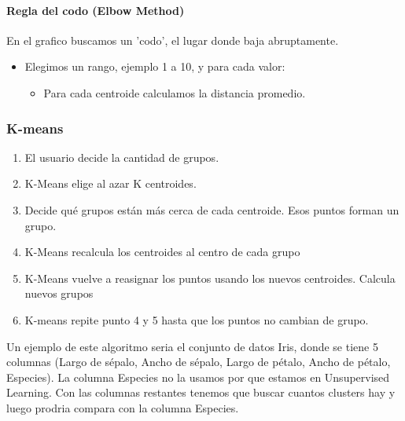 \documentclass[../main.tex]{subfiles}
\begin{document}
        \paragraph{Regla del codo (Elbow Method)}
            En el grafico buscamos un 'codo', el lugar donde baja abruptamente.
            \begin{itemize}
                \item Elegimos un rango, ejemplo 1 a 10, y para cada valor:
                    \begin{itemize}
                        \item Para cada centroide calculamos la distancia promedio.
                    \end{itemize}
            \end{itemize}
    \subsubsection{K-means}
        \begin{enumerate}
            \item El usuario decide la cantidad de grupos.
            \item K-Means elige al azar K centroides.
            \item Decide qué grupos están más cerca de cada centroide. Esos puntos forman un grupo.
            \item K-Means recalcula los centroides al centro de cada grupo		
            \item K-Means vuelve a reasignar los puntos usando los nuevos centroides. Calcula nuevos grupos
            \item K-means repite punto 4 y 5 hasta que los puntos no cambian de grupo. 
        \end{enumerate}
		 
        Un ejemplo de este algoritmo seria el conjunto de datos Iris, donde se tiene 5 columnas (Largo de sépalo, Ancho de sépalo, Largo de pétalo, Ancho de pétalo, Especies). La columna Especies no la usamos por que estamos en Unsupervised Learning. Con las columnas restantes tenemos que buscar cuantos clusters hay y luego prodria compara con la columna Especies.
	
\end{document}
